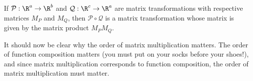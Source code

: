 \begin{theorem}
	If $\mathcal P:\R^a\to\R^b$ and $\mathcal Q:\R^c\to \R^a$ are matrix transformations with respective matrices 
	$M_P$ and $M_Q$, then $\mathcal P\circ \mathcal Q$ is a matrix transformation whose matrix is given
	by the matrix product $M_PM_Q$.
\end{theorem}

It should now be clear why the order of matrix multiplication matters. The order of function composition
matters (you must put on your socks before your shoes!), and since matrix multiplication corresponds
to function composition, the order of matrix multiplication must matter.
